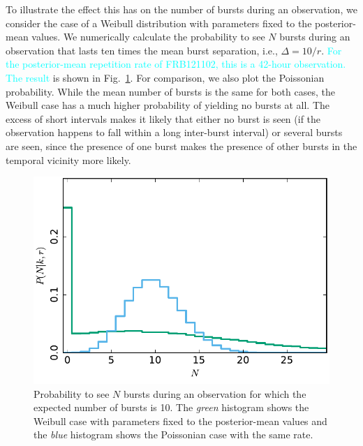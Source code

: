 \documentclass[fleqn,usenatbib]{mnras}
\newcommand{\new}[1]{\textcolor{cyan}{#1}}
\begin{document}
To illustrate the effect this has on the number of bursts during an observation, we consider the case of a Weibull distribution with parameters fixed to the posterior-mean values. We numerically calculate the probability to see $N$ bursts during an observation that lasts ten times the mean burst separation, i.e., $\Delta = 10/r$. \new{For the posterior-mean repetition rate of FRB121102, this is a 42-hour observation. The result} is shown in Fig.~\ref{fig:n_singleint}. For comparison, we also plot the Poissonian probability. While the mean number of bursts is the same for both cases, the Weibull case has a much higher probability of yielding no bursts at all. The excess of short intervals makes it likely that either no burst is seen (if the observation happens to fall within a long inter-burst interval) or several bursts are seen, since the presence of one burst makes the presence of other bursts in the temporal vicinity more likely.

\begin{figure}
	\includegraphics[width=1.0\columnwidth]{n_singleint.pdf}
	\caption{\label{fig:n_singleint}Probability to see $N$ bursts during an observation for which the expected number of bursts is 10. The \emph{green} histogram shows the Weibull case with parameters fixed to the posterior-mean values and the \emph{blue} histogram shows the Poissonian case with the same rate.}
\end{figure}
\end{document}
